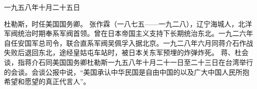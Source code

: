 一九五八年十月二十五日

\begin{maonote}
杜勒斯，时任美国国务卿。
张作霖（一八七五——一九二八），辽宁海城人，北洋军阀统治时期奉系军阀首领。曾在日本帝国主义支持下长期统治东北。一九二六年自任安国军总司令，联合直系军阀吴佩孚入据北京。一九二八年六月同蒋介石作战失败后退回东北，途经皇姑屯车站时，被日本关东军预埋的炸弹炸死。
蒋、杜会谈，指蒋介石同美国国务卿杜勒斯一九五八年十月二十一日至二十三日在台湾举行的会谈。会谈公报中说，“美国承认中华民国是自由中国的以及广大中国人民所抱希望和愿望的真正代言人”。
\end{maonote}
